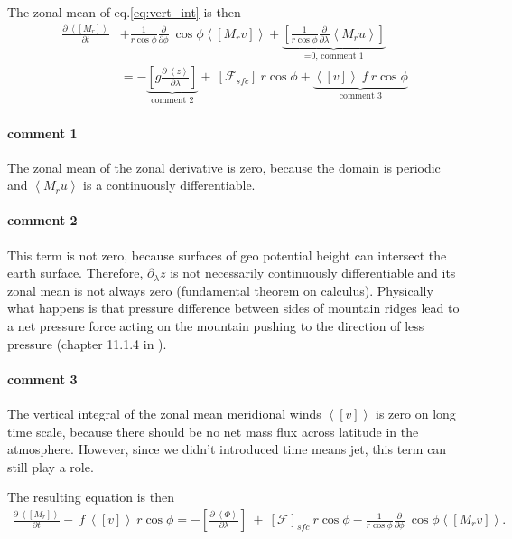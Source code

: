 \documentclass[11pt]{article}
\numberwithin{equation}{section}
\newcommand{\la}{\langle}
\newcommand{\ra}{\rangle}
\newcommand{\lara}[1]{\left\la{#1}\right\ra}
\newcommand{\cphi}{\cos \phi}
\begin{document}
The zonal mean of eq.\eqref{eq:vert_int} is then 
\begin{align} \label{eq:vert_int_zm}
\frac{\partial ~\lara{[M_r]}}{\partial t}  &+ \frac{1}{r \cos{\phi}}  \frac{\partial}{\partial \phi}  ~\cos{\phi} \lara{ [M_r v] } + \underbrace{\left[ \frac{1}{r \cos{\phi}} \frac{\partial}{\partial \lambda} \lara{M_r u} \right]}_\text{=0, comment 1} \nonumber \\
 &=   - \underbrace{\left[ g  \frac{\partial~\lara{z}}{\partial \lambda}  \right]}_\text{comment 2}+ ~ [\mathcal{F}_{sfc}] ~ r \cphi + \underbrace{\lara{ [v]} ~ f ~r \cphi }_\text{comment 3}
\end{align}

\paragraph{comment 1}
The zonal mean of the zonal derivative is zero, because the domain is periodic and $\lara{ M_r u}$ is a continuously differentiable.

\paragraph{comment 2}
This term is not zero, because surfaces of geo potential height can intersect the earth surface. Therefore, $\partial_\lambda z$ is not necessarily continuously  differentiable and its zonal mean is not always zero (fundamental theorem on calculus). Physically what happens is that pressure difference between sides of mountain ridges lead to a net pressure force acting on the mountain pushing to the direction of less pressure (chapter 11.1.4 in \citep{Peixoto2008}). 


\paragraph{comment 3}
The vertical integral of the zonal mean meridional winds $\lara{[v]}$ is zero on long time scale, because there should be no net mass flux across latitude in the atmosphere. However, since we didn't introduced time means jet, this term can still play a role.\par
\par

The resulting equation is then 
\begin{align*}
\frac{\partial ~\lara{[M_r]}}{\partial t}  -~ f~  \lara{ [v]}  ~r \cphi = - \left[ \frac{\partial~\lara{\Phi}}{\partial \lambda}  \right] ~+ ~ [\mathcal{F}]_{sfc} ~ r \cphi  - \frac{1}{r \cos{\phi}}  \frac{\partial}{\partial \phi}  ~\cos{\phi} \lara{ [M_r v] }. 
\end{align*}
\end{document}
